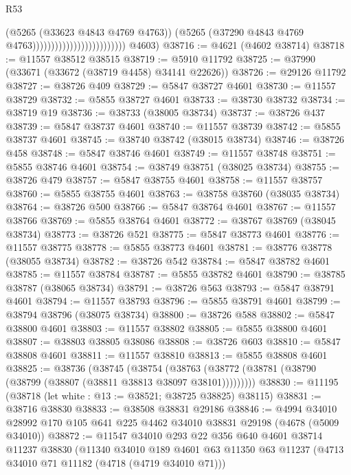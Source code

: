 \begin{lexlean}{R53}
\begin{coremodule}
                                                    (@5265 (@33623 @4843 @4769 @4763))
                                                    (@5265
                                                      (@37290
                                                        @4843
                                                        @4769
                                                        @4763)))))))))))))))))))))))))
      @4603)
@38716 := @4621 (@4602 @38714)
@38718 := @11557 @38512 @38515
@38719 := @5910 @11792
@38725 := @37990 (@33671 (@33672 (@38719 @4458) @34141 @22626))
@38726 := @29126 @11792
@38727 := @38726 @409
@38729 := @5847 @38727 @4601
@38730 := @11557 @38729
@38732 := @5855 @38727 @4601
@38733 := @38730 @38732
@38734 := @38719 @19
@38736 := @38733 (@38005 @38734)
@38737 := @38726 @437
@38739 := @5847 @38737 @4601
@38740 := @11557 @38739
@38742 := @5855 @38737 @4601
@38745 := @38740 @38742 (@38015 @38734)
@38746 := @38726 @458
@38748 := @5847 @38746 @4601
@38749 := @11557 @38748
@38751 := @5855 @38746 @4601
@38754 := @38749 @38751 (@38025 @38734)
@38755 := @38726 @479
@38757 := @5847 @38755 @4601
@38758 := @11557 @38757
@38760 := @5855 @38755 @4601
@38763 := @38758 @38760 (@38035 @38734)
@38764 := @38726 @500
@38766 := @5847 @38764 @4601
@38767 := @11557 @38766
@38769 := @5855 @38764 @4601
@38772 := @38767 @38769 (@38045 @38734)
@38773 := @38726 @521
@38775 := @5847 @38773 @4601
@38776 := @11557 @38775
@38778 := @5855 @38773 @4601
@38781 := @38776 @38778 (@38055 @38734)
@38782 := @38726 @542
@38784 := @5847 @38782 @4601
@38785 := @11557 @38784
@38787 := @5855 @38782 @4601
@38790 := @38785 @38787 (@38065 @38734)
@38791 := @38726 @563
@38793 := @5847 @38791 @4601
@38794 := @11557 @38793
@38796 := @5855 @38791 @4601
@38799 := @38794 @38796 (@38075 @38734)
@38800 := @38726 @588
@38802 := @5847 @38800 @4601
@38803 := @11557 @38802
@38805 := @5855 @38800 @4601
@38807 := @38803 @38805 @38086
@38808 := @38726 @603
@38810 := @5847 @38808 @4601
@38811 := @11557 @38810
@38813 := @5855 @38808 @4601
@38825 := @38736
    (@38745
      (@38754 (@38763 (@38772 (@38781 (@38790 (@38799 (@38807 (@38811 @38813 @38097 @38101)))))))))
@38830 := @11195 (@38718 (let white : @13 := @38521; @38725 @38825) @38115)
@38831 := @38716 @38830
@38833 := @38508 @38831 @29186
@38846 := @4994 @34010 @28992 @170 @105 @641 @225 @4462 @34010 @38831 @29198 (@4678 (@5009 @34010))
@38872 := @11547
    @34010
    @293
    @22
    @356
    @640
    @4601
    @38714
    @11237
    @38830
    (@11340
      @34010
      @189
      @4601
      @63
      @11350
      @63
      @11237
      (@4713 @34010 @71 @11182 (@4718 (@4719 @34010 @71)))

\end{coremodule}
\end{lexlean}
